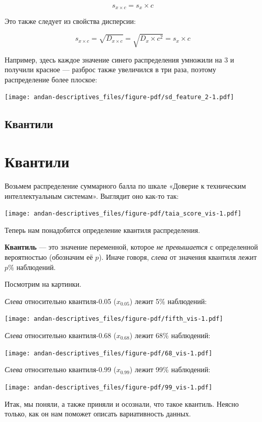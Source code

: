 \documentclass[
  letterpaper,
]{scrbook}
\theoremstyle{definition}
\theoremstyle{remark}
\begin{document}
\[
s_{x \times c} = s_x \times c
\]

Это также следует из свойства дисперсии:

\[
s_{x \times c} = \sqrt{D_{x \times c}} = \sqrt{D_x \times c^2} = s_x \times c
\]

Например, здесь каждое значение синего распределения умножили на \(3\) и
получили красное --- разброс также увеличился в три раза, поэтому
распределение более плоское:

\texttt{[image: andan-descriptives\_files/figure-pdf/sd\_feature\_2-1.pdf]}

\subsection{Квантили}\label{andan-descriptives-quantiles}

\section{Квантили}\label{quantiles}

Возьмем распределение суммарного балла по шкале «Доверие к техническим
интеллектуальным системам». Выглядит оно как-то так:

\texttt{[image: andan-descriptives\_files/figure-pdf/taia\_score\_vis-1.pdf]}

Теперь нам понадобится определение квантиля распределения.

\textbf{Квантиль} --- это значение переменной, которое \emph{не
превышается} с определенной вероятностью (обозначим её \(p\)). Иначе
говоря, \emph{слева} от значения квантиля лежит \(p\%\) наблюдений.

Посмотрим на картинки.

\emph{Слева} относительно квантиля-0.05 (\(x_{0.05}\)) лежит 5\%
наблюдений:

\texttt{[image: andan-descriptives\_files/figure-pdf/fifth\_vis-1.pdf]}

\emph{Слева} относительно квантиля-0.68 (\(x_{0.68}\)) лежит 68\%
наблюдений:

\texttt{[image: andan-descriptives\_files/figure-pdf/68\_vis-1.pdf]}

\emph{Слева} относительно квантиля-0.99 (\(x_{0.99}\)) лежит 99\%
наблюдений:

\texttt{[image: andan-descriptives\_files/figure-pdf/99\_vis-1.pdf]}

Итак, мы поняли, а также приняли и осознали, что такое квантиль. Неясно
только, как он нам поможет описать вариативность данных.
\end{document}
